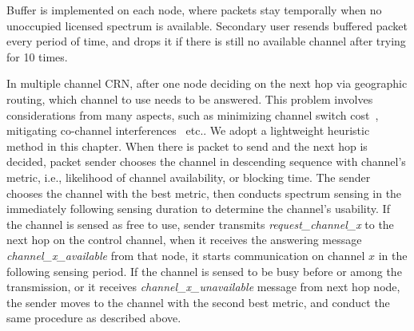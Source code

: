 Buffer is implemented on each node, where packets stay temporally when no unoccupied licensed spectrum is available.
Secondary user resends buffered packet every period of time, and drops it if there is still no available channel after trying for 10 times.





In multiple channel CRN, after one node deciding on the next hop via geographic routing, which channel to use needs to be answered.
This problem involves considerations from many aspects, such as minimizing channel switch cost~\cite{spectrumDecision_2013mass}, mitigating co-channel interferences~\cite{DySpAN12_Di} etc..
We adopt a lightweight heuristic method in this chapter. 
When there is packet to send and the next hop is decided, packet sender chooses the channel in descending sequence with channel's metric, i.e., likelihood of channel availability, or blocking time.
The sender chooses the channel with the best metric, then conducts spectrum sensing in the immediately following sensing duration to determine the channel's usability.
If the channel is sensed as free to use, sender transmits \textit{request\_channel\_x} to the next hop on the control channel, when it receives the answering message \textit{channel\_x\_available} from that node, it starts communication on channel $x$ in the following sensing period.
If the channel is sensed to be busy before or among the transmission, or it receives \textit{channel\_x\_unavailable} message from next hop node, the sender moves to the channel with the second best metric, and conduct the same procedure as described above.




